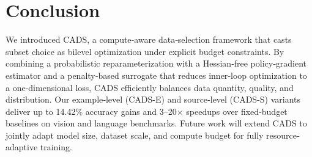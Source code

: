\section{Conclusion}
We introduced CADS, a compute‐aware data‐selection framework that casts subset choice as bilevel optimization under explicit budget constraints. By combining a probabilistic reparameterization with a Hessian‐free policy‐gradient estimator and a penalty‐based surrogate that reduces inner‐loop optimization to a one‐dimensional loss, CADS efficiently balances data quantity, quality, and distribution. Our example‐level (CADS-E) and source‐level (CADS-S) variants deliver up to 14.42\% accuracy gains and 3–20× speedups over fixed‐budget baselines on vision and language benchmarks. Future work will extend CADS to jointly adapt model size, dataset scale, and compute budget for fully resource‐adaptive training.